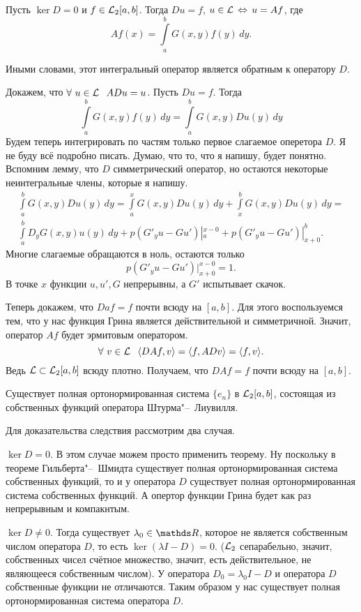 \begin{The}
Пусть $\ker D=0$ и $f\in\mathcal L_2[a,b]$. Тогда $Du = f$, $u\in \mathcal L\,\Leftrightarrow\, u = Af$, где
\[
  Af(x) = \int\limits_a^b G(x,y) f(y)\,dy.
\]
\end{The}
Иными словами, этот интегральный оператор является обратным к оператору $D$.
\begin{Proof}
 Докажем, что $\forall\ u\in \L \pau ADu = u$. Пусть $Du = f$. Тогда
\[
  \int\limits_a^b G(x,y)f(y)\,dy = \int\limits_a^b G(x,y) Du(y)\,dy
\]
Будем теперь интегрировать по частям только первое слагаемое оперетора $D$. Я не буду всё подробно писать. Думаю, что то, что я напишу, будет понятно. Вспомним лемму, что $D$ симметрический оператор, но остаются некоторые неинтегральные члены, которые я напишу.
\begin{multline*}
\int\limits_a^b G(x,y) Du(y)\,dy = \int\limits_a^x G(x,y) Du(y)\,dy + \int\limits_x^b G(x,y) Du(y)\,dy = \\
 \int\limits_a^b D_y G(x,y) u(y)\,dy + p(G'_yu - Gu')|_a^{x-0} + p(G'_y u - Gu')|_{x+0}^b.
\end{multline*}
Многие слагаемые обращаются в ноль, остаются только
\[
  p(G'_y u - Gu')|_{x+0}^{x-0} = 1.
\]
В точке $x$ функции $u, u', G$ непрерывны, а $G'$ испытывает скачок.


Теперь докажем, что $Da f= f$ почти всюду на $[a,b]$. Для этого воспользуемся тем, что у нас функция Грина является действительной и симметричной. Значит, оператор $Af$ будет эрмитовым оператором.
\[
  \forall\ v\in\L\pau \la DA f,v\ra = \la f, AD v\ra = \la f,v\ra.
\]
Ведь $\mathcal L\subset \mathcal L_2[a,b]$ всюду плотно. Получаем, что $DA f=f$ почти всюду на $[a,b]$.
\end{Proof}
\begin{Sl}
  Существует полная ортонормированная система $\{e_n\}$ в $\mathcal L_2[a,b]$, состоящая из собственных функций оператора Штурма"--~Лиувилля.
\end{Sl}
\begin{Proof}
Для доказательства следствия рассмотрим два случая.
\begin{azItems}
\item $\ker D=0$. В этом случае можем просто применить теорему. Ну поскольку в теореме Гильберта"--~Шмидта существует полная ортонормированная система собственных функций, то и у оператора $D$ существует полная ортонормированная система собственных функций. А опертор функции Грина будет как раз непрерывным и компакнтым.
\item $\ker D\ne 0$. Тогда существует $\lambda_0\in\R$, которое не является собственным числом оператора $D$, то есть $\ker (\lambda I - D) = 0$. ($\mathcal L_2$ сепарабельно, значит, собственных чисел счётное множество, значит, есть действительное, не являющееся собственным числом). У оператора $D_0 = \lambda_0 I - D$ и оператора $D$ собственные функции не отличаются. Таким образом у нас существует полная ортонормированная система оператора $D$.
\end{azItems}
\end{Proof}


